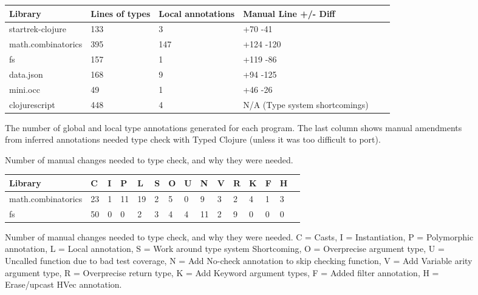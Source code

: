 \begin{figure*}
\begin{tabular}{| l | l | l | l | l | l |}
  Library            & Lines of types  & Local annotations & Manual Line +/- Diff \\
  \hline
  startrek-clojure   & 133             & 3                 & +70 -41 \\
  math.combinatorics & 395             & 147               & +124 -120\\
  fs                 & 157             & 1                 & +119 -86\\
  data.json          & 168             & 9                 & +94 -125 \\
  mini.occ           & 49              & 1                 & +46 -26\\
  clojurescript      & 448             & 4                 & N/A (Type system shortcomings)\\
\end{tabular}
\caption{The number of global and local type annotations generated for each program.
  The last column shows manual amendments from inferred annotations needed
  type check with Typed Clojure (unless it was too difficult to port).
  }
\caption{
  Number of manual changes needed to type check, and why they were needed.
  }
  \label{infer:fig:gentype}
\end{figure*}

\begin{figure*}
\begin{tabular}{| l | l | l | l | l | l | l | l | l | l | l | l | l | l | l |}
  Library            & C  & I & P & L & S & O & U & N & V & R & K & F & H\\
  \hline
  math.combinatorics & 23 & 1 & 11& 19& 2 & 5 & 0 & 9 & 3 & 2 & 4 & 1 & 3\\
  fs                 & 50 & 0 & 0 & 2 & 3 & 4 & 4 & 11& 2 & 9 & 0 & 0 & 0\\
\end{tabular}
\caption{
  Number of manual changes needed to type check, and why they were needed.
  C = Casts,
  I = Instantiation,
  P = Polymorphic annotation,
  L = Local annotation,
  S = Work around type system Shortcoming,
  O = Overprecise argument type,
  U = Uncalled function due to bad test coverage,
  N = Add No-check annotation to skip checking function,
  V = Add Variable arity argument type,
  R = Overprecise return type,
  K = Add Keyword argument types,
  F = Added filter annotation,
  H = Erase/upcast HVec annotation.
  }
  \label{infer:fig:manualchanges}
\end{figure*}



